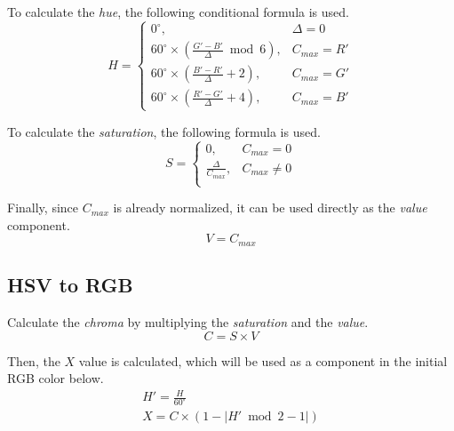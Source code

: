 \documentclass{article}
\begin{document}
To calculate the \textit{hue}, the following conditional formula is used.
\begin{equation*}
  H =
  \begin{cases}
    0^\circ,                                                    & \Delta = 0 \\
    60^\circ \times \left(\frac{G'-B'}{\Delta} \bmod 6 \right), & C_{max} = R' \\
    60^\circ \times \left(\frac{B'-R'}{\Delta} + 2 \right),     & C_{max} = G' \\
    60^\circ \times \left(\frac{R'-G'}{\Delta} + 4 \right),     & C_{max} = B'
  \end{cases}
\end{equation*}

To calculate the \textit{saturation}, the following formula is used.
\begin{equation*}
  S =
  \begin{cases}
    0,                      & C_{max} = 0 \\
    \frac{\Delta}{C_{max}}, & C_{max} \neq 0 \\
  \end{cases}
\end{equation*}

Finally, since $C_{max}$ is already normalized, it can be used directly as the
\textit{value} component.
\begin{equation*}
  V = C_{max}
\end{equation*}

\subsection{HSV to RGB}

Calculate the \textit{chroma} by multiplying the \textit{saturation} and the
\textit{value}.
\begin{equation*}
  C = S \times V
\end{equation*}

Then, the $X$ value is calculated, which will be used as a component in the
initial RGB color below.
\begin{gather*}
  H' = \frac{H}{60^\circ} \\
  X = C \times \left( 1 - \left| H' \bmod 2 - 1 \right| \right)
\end{gather*}
\end{document}
